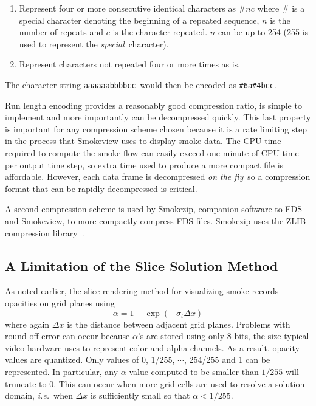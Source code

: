 {\begin{enumerate}
\item Represent four or more consecutive identical characters as
$\# n c$ where $\#$ is a special character denoting the beginning
of a repeated sequence, $n$ is the number of repeats and $c$ is
the character repeated.  $n$ can be up to 254 (255 is used to
represent the {\em special}\ character).
\item Represent
characters not repeated four or more times as is.
\end{enumerate}

The character string {\tt aaaaaabbbbcc}\ would then be encoded as {\tt \#6a\#4bcc}.

Run length encoding provides a reasonably good compression ratio, is simple to implement and more importantly can be decompressed quickly. This last property is important for any compression scheme chosen because it is a rate limiting step in the process that Smokeview uses to display smoke data. The CPU time required to compute the smoke flow can easily exceed one minute of CPU time
per output time step, so extra time used to produce a more compact file is affordable. However, each data frame is decompressed {\em on the fly}\ so a compression format that can be rapidly decompressed is critical.

A second compression scheme is used by Smokezip, companion software to FDS and Smokeview, to more compactly compress FDS files.  Smokezip uses the ZLIB compression library~\cite{ZLIB}.


\subsection{A Limitation of the Slice Solution Method}
As noted earlier, the slice rendering method for visualizing smoke records opacities on grid planes using
\begin{equation}
\label{eq:alpha3}
\alpha=1-\exp(-\sigma_t\Delta x)
\end{equation}
where again $\Delta x$ is the distance between adjacent grid planes.  Problems with round off error can occur because $\alpha$'s are stored using only 8 bits, the size typical video hardware uses to represent color and alpha channels.
As a result, opacity values are quantized.  Only values of 0, 1/255, $\cdots$, 254/255 and 1 can be represented.  In particular, any $\alpha$ value computed to be smaller than $1/255$ will truncate to 0.
This can occur when more grid cells are used to resolve a solution domain, {\em i.e.}\ when $\Delta x$ is sufficiently small so that $\alpha<1/255$.

}
